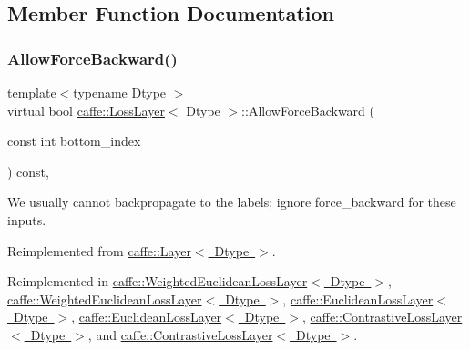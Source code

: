 \subsection{Member Function Documentation}
\mbox{\label{classcaffe_1_1_loss_layer_a36d35155bfe0de53a79c517f33759612}} 
\subsubsection{\texorpdfstring{Allow\+Force\+Backward()}{AllowForceBackward()}\hspace{0.1cm}{\footnotesize\ttfamily [1/2]}}
{\footnotesize\ttfamily template$<$typename Dtype $>$ \\
virtual bool \mbox{\hyperlink{classcaffe_1_1_loss_layer}{caffe\+::\+Loss\+Layer}}$<$ Dtype $>$\+::Allow\+Force\+Backward (\begin{DoxyParamCaption}\item[{const int}]{bottom\+\_\+index }\end{DoxyParamCaption}) const\hspace{0.3cm}{\ttfamily [inline]}, {\ttfamily [virtual]}}

We usually cannot backpropagate to the labels; ignore force\+\_\+backward for these inputs. 

Reimplemented from \mbox{\hyperlink{classcaffe_1_1_layer_a1c0b2bffcd6d57e4bd49f820941badb6}{caffe\+::\+Layer$<$ Dtype $>$}}.



Reimplemented in \mbox{\hyperlink{classcaffe_1_1_weighted_euclidean_loss_layer_a6b996834a2a27bb8d2d9b48873b6cd65}{caffe\+::\+Weighted\+Euclidean\+Loss\+Layer$<$ Dtype $>$}}, \mbox{\hyperlink{classcaffe_1_1_weighted_euclidean_loss_layer_a6b996834a2a27bb8d2d9b48873b6cd65}{caffe\+::\+Weighted\+Euclidean\+Loss\+Layer$<$ Dtype $>$}}, \mbox{\hyperlink{classcaffe_1_1_euclidean_loss_layer_a76dd3fde9f09cb9840f05ee035b5a2c5}{caffe\+::\+Euclidean\+Loss\+Layer$<$ Dtype $>$}}, \mbox{\hyperlink{classcaffe_1_1_euclidean_loss_layer_a76dd3fde9f09cb9840f05ee035b5a2c5}{caffe\+::\+Euclidean\+Loss\+Layer$<$ Dtype $>$}}, \mbox{\hyperlink{classcaffe_1_1_contrastive_loss_layer_af0f16d5119ac6118b670c1966c38fd7d}{caffe\+::\+Contrastive\+Loss\+Layer$<$ Dtype $>$}}, and \mbox{\hyperlink{classcaffe_1_1_contrastive_loss_layer_af0f16d5119ac6118b670c1966c38fd7d}{caffe\+::\+Contrastive\+Loss\+Layer$<$ Dtype $>$}}.

